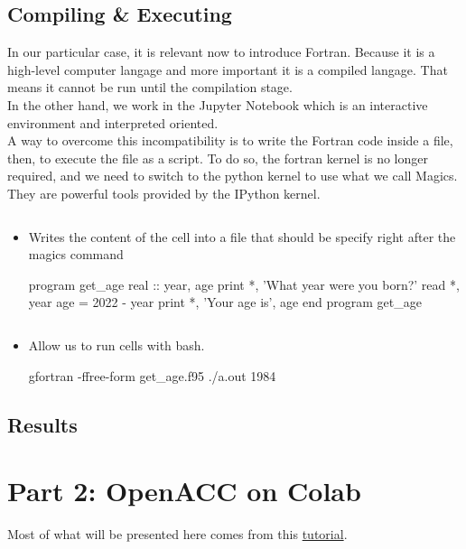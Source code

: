 \documentclass[10pt,a4paper]{article}
\begin{document}
\subsection{Compiling \& Executing}
In our particular case, it is relevant now to introduce Fortran. Because it is a high-level computer langage and more important it is a compiled langage. That means it cannot be run until the compilation stage.\\
In the other hand, we work in the Jupyter Notebook which is an interactive environment and interpreted oriented.\\
A way to overcome this incompatibility is to write the Fortran code inside a file, then, to execute the file as a script.
To do so, the fortran kernel is no longer required, and we need to switch to the python kernel to use what we call Magics. They are powerful tools provided by the IPython kernel.
\begin{itemize}

\item
\begin{lstlisting}[language=bash]
%%writefile
\end{lstlisting}
Writes the content of the cell into a file that should be specify right after the magics command
\begin{mylisting}

program get_age
    real :: year, age
    print *, 'What year were you born?'
    read *, year
    age = 2022 - year
    print *, 'Your age is', age
end program get_age
\end{mylisting}
\item 
\begin{lstlisting}[language=bash]
%%bash
\end{lstlisting}
Allow us to run cells with bash.
\begin{mylisting}

gfortran -ffree-form get_age.f95
./a.out
1984
\end{mylisting}
\end{itemize}
\subsection{Results}

\section{Part 2: OpenACC on Colab}
Most of what will be presented here comes from this \href{https://colab.research.google.com/github/ENCCS/OpenACC-CUDA-beginners/blob/colab_gcc/examples/openACC_CUDA_colab.ipynb}{tutorial}.
\end{document}
